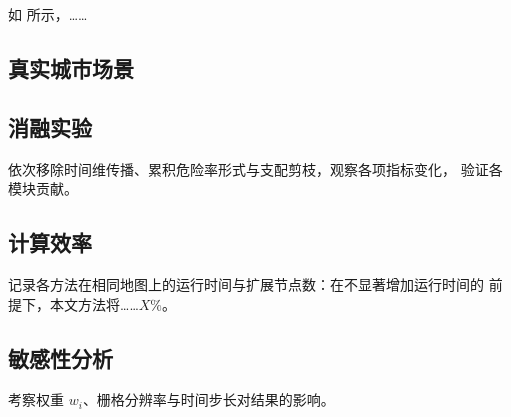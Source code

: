 如  所示，……

\subsection{真实城市场景}



\subsection{消融实验}

依次移除时间维传播、累积危险率形式与支配剪枝，观察各项指标变化，
验证各模块贡献。

\subsection{计算效率}

记录各方法在相同地图上的运行时间与扩展节点数：在不显著增加运行时间的
前提下，本文方法将……$X\%$。

\subsection{敏感性分析}
\label{sec:sensitivity}

考察权重 $w_i$、栅格分辨率与时间步长对结果的影响。
